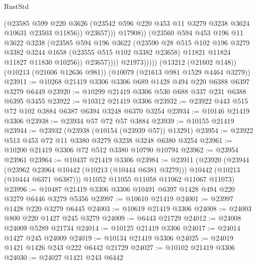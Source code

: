 \begin{lexlean}{RustStd}
\begin{coremodule}
                              (@23585
                                @599
                                @220
                                @3626
                                (@23542 @596 @220 @453 @11 @3279 @3238 @3624 @10631 @23503 @11856))
                              @23657)))
                        @17908))
                    (@23560
                      @594
                      @453
                      @196
                      @11
                      @3622
                      @3238
                      (@23585
                        @594
                        @196
                        @3622
                        (@23590
                          @28
                          @515
                          @102
                          @196
                          @3279
                          @3382
                          @3244
                          @1658
                          (@23555 @515 @102 @3382 @23658)
                          @11821
                          @11824
                          @11827
                          @11830
                          @10256))
                      @23657))))
              @21973)))))
    (@13212 (@21602 @148))
    (@10213 (@21606 @12636 @981))
    (@10079 (@21613 @981 @1529 @4464 @3279))
@23911 := @10268 @21419 @3306 @3306 @689 @1428 @494 @220 @6388 @6397 @3279 @6449
@23920 := @10299 @21419 @3306 @530 @688 @337 @231 @6388 @6395 @3455
@23922 := @10312 @21419 @3306
@23932 := @23922 @443 @515 @72 @102 @3884 @6387 @6394 @3248 @6370 @3254
@23934 := @10146 @21419 @3306
@23938 := @23934 @57 @72 @57 @3884
@23939 := @10155 @21419
@23944 := @23932 (@23938 (@10154 (@23939 @57)) @13291)
@23954 := @23922 @513 @453 @72 @11 @3380 @3279 @3238 @3248 @6380 @3254
@23961 := @10200 @21419 @3306 @72 @512 @3380 @10790 @10794
@23962 := @23954 @23961
@23964 := @10437 @21419 @3306
@23984 := @23911
    (@23920
      (@23944
        (@23962 @23964 @10442 (@10213 (@10444 @6381 @3279)))
        @10442
        (@10213 (@10444 @6371 @6387)))
      @11052
      @11055
      @11058
      @11062
      @11067
      @11073)
@23996 := @10487 @21419 @3306 @3306 @10491 @6397 @1428 @494 @220 @3279 @6446 @3279 @5356
@23997 := @10610 @21419
@24001 := @23997 @1428 @220 @3279 @6445
@24003 := @10619 @21419 @3306
@24008 := @24003 @800 @220 @1427 @245 @3279
@24009 := @6443 @21729
@24012 := @24008 @24009 @5289 @21734
@24014 := @10125 @21419 @3306
@24017 := @24014 @1427 @245 @24009
@24019 := @10134 @21419 @3306
@24025 := @24019 @1421 @1426 @243 @222 @6442 @21729
@24027 := @10102 @21419 @3306
@24030 := @24027 @1421 @243 @6442

\end{coremodule}
\end{lexlean}
